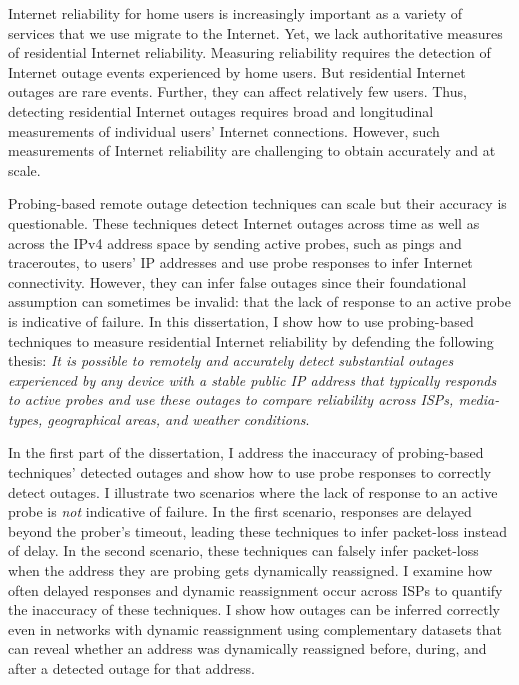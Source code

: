 Internet reliability for home users is increasingly important as a variety of services that we use migrate to the Internet. Yet, we lack authoritative measures of residential Internet reliability. Measuring reliability requires the detection of Internet outage events experienced by home users. But residential Internet outages are rare events. Further, they can affect relatively few users. Thus, detecting residential Internet outages requires broad and longitudinal measurements of individual users' Internet connections. However, such measurements of Internet reliability are challenging to obtain accurately and at scale. %

Probing-based remote outage detection techniques can scale but their accuracy is questionable. These techniques detect Internet outages across time as well as across the IPv4 address space by sending active probes, such as pings and traceroutes, to users' IP addresses and use probe responses to infer Internet connectivity. However, they can infer false outages since their foundational assumption can sometimes be invalid: that the lack of response to an active probe is indicative of failure. In this dissertation, I show how to use probing-based techniques to measure residential Internet reliability by defending the following thesis: \emph{It is possible to remotely and accurately detect substantial outages experienced by any device with a stable public IP address that typically responds to active probes and use these outages to compare reliability across ISPs, media-types, geographical areas, and weather conditions}.

In the first part of the dissertation, I address the inaccuracy of probing-based techniques' detected outages and show how to use probe responses to correctly detect outages. I illustrate two scenarios where the lack of response to an active probe is \emph{not} indicative of failure. In the first scenario, responses are delayed beyond the prober's timeout, leading these techniques to infer packet-loss instead of delay. In the second scenario, these techniques can falsely infer packet-loss when the address they are probing gets dynamically reassigned. I examine how often delayed responses and dynamic reassignment occur across ISPs to quantify the inaccuracy of these techniques. I show how outages can be inferred correctly even in networks with dynamic reassignment using complementary datasets that can reveal whether an address was dynamically reassigned before, during, and after a detected outage for that address.

